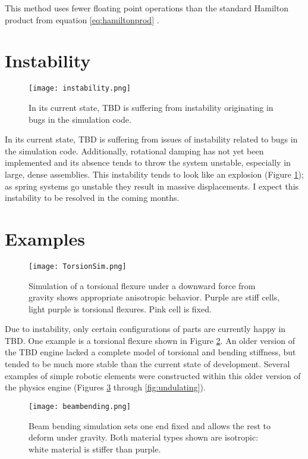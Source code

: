 { This method uses fewer floating point operations than the standard Hamilton product from equation \ref{eq:hamiltonprod} \cite{Reinalter}.

\section{Instability}

\begin{figure}
  \texttt{[image: instability.png]}
  \caption{In its current state, TBD is suffering from instability originating in bugs in the simulation code.}
  \label{fig:instability}
\end{figure}

In its current state, TBD is suffering from issues of instability related to bugs in the simulation code.  Additionally, rotational damping has not yet been implemented and its absence tends to throw the system unstable, especially in large, dense assemblies.  This instability tends to look like an explosion (Figure \ref{fig:instability}); as spring systems go unstable they result in massive displacements.  I expect this instability to be resolved in the coming months.

\section{Examples}

\begin{figure}
  \texttt{[image: TorsionSim.png]}
  \caption{Simulation of a torsional flexure under a downward force from gravity shows appropriate anisotropic behavior.  Purple are stiff cells, light purple is torsional flexures.  Pink cell is fixed.}
  \label{fig:TorsionSim}
\end{figure}

Due to instability, only certain configurations of parts are currently happy in TBD.  One example is a torsional flexure shown in Figure \ref{fig:TorsionSim}.  An older version of the TBD engine lacked a complete model of torsional and bending stiffness, but tended to be much more stable than the current state of development.  Several examples of simple robotic elements were constructed within this older version of the physics engine (Figures \ref{fig:beambending} through \ref{fig:undulating}).

\begin{figure}
  \texttt{[image: beambending.png]}
  \caption{Beam bending simulation sets one end fixed and allows the rest to deform under gravity.  Both material types shown are isotropic: white material is stiffer than purple.}
  \label{fig:beambending}
\end{figure}

}
